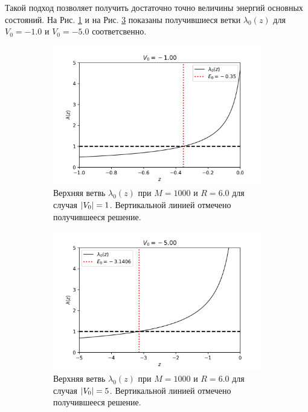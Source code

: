 \documentclass[10pt]{article}
\begin{document}
Такой подход позволяет получить достаточно точно величины энергий основных состояний. На Рис. \ref{fig:-1.0_l0} и на Рис. \ref{fig:-5.0_l0} показаны получившиеся ветки $\lambda_0(z)$ для $V_0 = -1.0$ и $V_0=-5.0$ соответсвенно.
\begin{figure}[htbp]
 \centering
 \begin{subfigure}[b]{0.49\textwidth}
    \includegraphics[width=\textwidth]{../figures/-1.0_l0}
    \caption{Верхняя ветвь $\lambda_0(z)$ при $M=1000$ и $R=6.0$ для случая $\abs{V_0}=1$. Вертикальной линией отмечено получившееся решение.}
    \label{fig:-1.0_l0}
\end{subfigure}
\hfill
\begin{subfigure}[b]{0.49\textwidth}
    \centering
    \includegraphics[width=\textwidth]{../figures/-5.0_l0}
    \caption{Верхняя ветвь $\lambda_0(z)$ при $M=1000$ и $R=6.0$ для случая $\abs{V_0}=5$. Вертикальной линией отмечено получившееся решение.}
    \label{fig:-5.0_l0}
\end{subfigure}
\caption{}
\end{figure}
\end{document}
